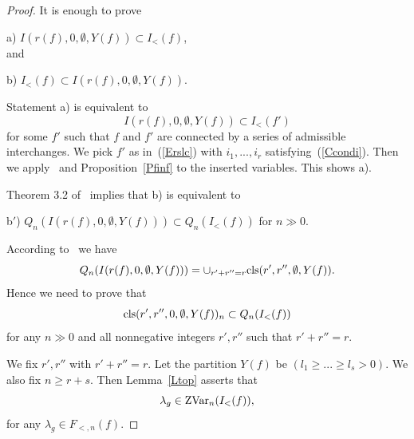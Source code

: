 \documentclass[10pt]{amsart}\oddsidemargin -1mm \evensidemargin -1mm \topmargin -15mm\headheight5mm \headsep 3.5mm \textheight 245mm\textwidth 170mm
\theoremstyle{definition}\newtheorem{theorem}{Theorem}[section]\newtheorem{lemma}[theorem]{Lemma}\newtheorem{remark}[theorem]{Remark}\newtheorem{proposition}[theorem]{Proposition}\newtheorem{corollary}[theorem]{Corollary}\newtheorem{definition}[theorem]{Definition}\newtheorem{Ex}[theorem]{Example}\newtheorem{obs}[theorem]{Observation}\newtheorem{nota}[theorem]{Notation}
\begin{document}
\begin{proof} It is enough to prove

a) $I(r(f), 0, \emptyset, {Y}(f))\subset I_<(f)$,\\
and

b) $I_<(f)\subset I(r(f), 0, \emptyset, {Y}(f))$.

Statement a) is equivalent to
\begin{equation}I(r(f), 0, \emptyset, {Y}(f))\subset I_<(f')\label{Est1}\end{equation}
for some $f'$ such that $f$ and $f'$ are connected by a series of admissible interchanges. We pick $f'$ as in~(\ref{Erslc}) with $i_1,..., i_r$ satisfying~(\ref{Ccondi}). Then we apply~\cite[Lemma~5.4]{PP2} and Proposition~\ref{Pfinf} to the inserted variables. This shows a).

Theorem 3.2 of~\cite{PP2} implies that b) is equivalent to

b$'$) $Q_n(I(r(f), 0, \emptyset, {Y}(f)))\subset Q_n(I_<(f))$ for $n\gg0$.

According to~\cite[Lemma~7.6c)]{PP1} we have
$$Q_n(I(r(f), 0, \emptyset, {Y}(f)))=\cup_{r'+r''=r}{\rm cls}(r', r'', \emptyset, {Y}(f)).$$
Hence we need to prove that
$${\rm cls}(r', r'', 0, \emptyset, {Y}(f))_n\subset Q_n(I_<(f))$$
for any $n\gg0$ and all nonnegative integers $r', r''$ such that $r'+r''=r$. 

We fix $r', r''$ with $r'+r''=r$. 
Let the partition ${Y}(f)$ be $(l_1\ge...\ge l_s>0)$. 
We also fix $n\ge r+s$. 
Then Lemma~\ref{Ltop} asserts that
\begin{equation}\lambda_{g}\in {\rm ZVar}_n(I_<(f)),\label{Ela}\end{equation}
for any $\lambda_g\in F_{<, n}(f)$. 


\end{proof}
\end{document}

